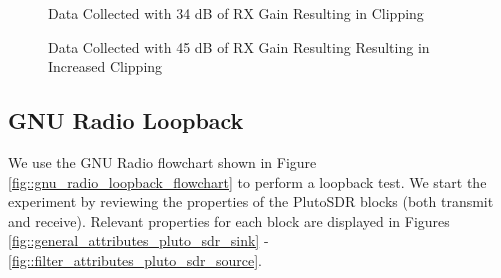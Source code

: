 \documentclass{article}
\begin{document}
\begin{figure}[H]
	\centerline{}
	\caption{Data Collected with 34 dB of RX Gain Resulting in Clipping}
	\label{fig::matlab_loopback_agc_manual_34db_gain}
\end{figure}

\begin{figure}[H]
	\centerline{}
	\caption{Data Collected with 45 dB of RX Gain Resulting Resulting in Increased Clipping}
	\label{fig::matlab_loopback_agc_manual_45db_gain}
\end{figure}

\subsection{GNU Radio Loopback}

We use the GNU Radio flowchart shown in Figure \ref{fig::gnu_radio_loopback_flowchart} to perform a loopback test. We start the experiment by reviewing the properties of the PlutoSDR blocks (both transmit and receive). Relevant properties for each block are displayed in Figures \ref{fig::general_attributes_pluto_sdr_sink} - \ref{fig::filter_attributes_pluto_sdr_source}.
\end{document}

